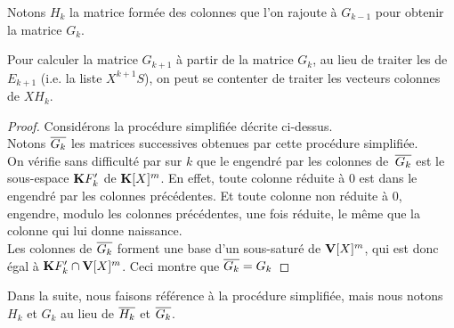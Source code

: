 Notons $H_k$ la matrice formée des colonnes que l'on rajoute à $G_{k-1}$
pour obtenir la matrice $G_k$. 


\begin{ffact} \label{ffactHksuffit}
Pour calculer la matrice $G_{k+1}$ à partir de la matrice $G_k$, au lieu de traiter les \gtrs de $E_{k+1}$ (i.e. la liste $X^{k+1}S$), on peut se contenter de traiter les
vecteurs colonnes de $XH_k$.  
\end{ffact}
%
\begin{proof}{} 
Considérons la procédure simplifiée décrite ci-dessus. \\
Notons $\overline{G_k}$ les matrices successives obtenues par cette procédure simplifiée.
\\
On vérifie sans difficulté par \recu sur $k$ que le \Kev engendré par les colonnes
de~$\overline{G_k}$ est le sous-espace $\mathbf{K} F'_k$ de $\mathbf{K}[X]^{m}$.
En effet, toute colonne réduite à $0$ est dans le \Kev engendré par les colonnes précédentes. Et toute colonne non réduite à $0$, engendre, modulo les colonnes précédentes, une fois réduite, le m\^eme \Kev 
que la colonne qui lui donne naissance.
\\
Les colonnes de $\overline{G_k}$ forment une base d'un
sous-\Vmo saturé de $\mathbf{V}[X]^{m}$, qui est donc égal à $\mathbf{K} F'_k\cap\mathbf{V}[X]^{m}$. Ceci montre que $\overline{G_k}=G_k$
\end{proof}
%

Dans la suite, nous faisons référence à la procédure simplifiée, mais nous notons $H_k$ et $G_k$ au lieu de $\overline{H_k}$ et $\overline{G_k}$.


